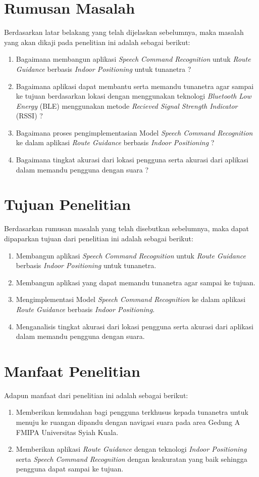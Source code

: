 \newpage


\section{Rumusan Masalah}
Berdasarkan latar belakang yang telah dijelaskan sebelumnya, maka masalah yang akan dikaji pada penelitian ini adalah sebagai berikut:
\begin{enumerate}
	\item Bagaimana membangun aplikasi \textit{Speech Command Recognition} untuk \textit{Route Guidance} berbasis \textit{Indoor Positioning} untuk tunanetra ?
	\item Bagaimana aplikasi dapat membantu serta memandu tunanetra agar sampai ke tujuan berdasarkan lokasi dengan menggunakan teknologi \textit{Bluetooth Low Energy }(BLE) menggunakan metode \textit{Recieved Signal Strength Indicator} (RSSI) ?
	\item Bagaimana proses pengimplementasian Model \textit{Speech Command Recognition} ke dalam aplikasi \textit{Route Guidance} berbasis \textit{Indoor Positioning} ?
	\item Bagaimana tingkat akurasi dari lokasi pengguna serta akurasi dari aplikasi dalam memandu pengguna dengan suara ?
\end{enumerate}

\section{Tujuan Penelitian}
Berdasarkan rumusan masalah yang telah disebutkan sebelumnya, maka dapat dipaparkan tujuan dari penelitian ini adalah sebagai berikut: 
\begin{enumerate}
	\item Membangun aplikasi \textit{Speech Command Recognition} untuk \textit{Route Guidance} berbasis \textit{Indoor Positioning} untuk tunanetra.
	\item Membangun aplikasi yang dapat memandu tunanetra agar sampai ke tujuan.
	\item Mengimplementasi Model \textit{Speech Command Recognition} ke dalam aplikasi \textit{Route Guidance} berbasis \textit{Indoor Positioning}.
	\item Menganalisis tingkat akurasi dari lokasi pengguna serta akurasi dari aplikasi dalam memandu pengguna dengan suara.
\end{enumerate}


\section{Manfaat Penelitian}
Adapun manfaat dari penelitian ini adalah sebagai berikut:
\begin{enumerate}
	\item Memberikan kemudahan bagi pengguna terkhusus kepada tunanetra untuk menuju ke ruangan dipandu dengan navigasi suara pada area Gedung A FMIPA Universitas Syiah Kuala.
	\item Memberikan aplikasi \textit{Route Guidance} dengan teknologi \textit{Indoor Positioning} serta \textit{Speech Command Recognition} dengan keakuratan yang baik sehingga pengguna dapat sampai ke tujuan.
\end{enumerate}


\fancyhf{} 
\fancyfoot[R]{\thepage}
\begin{comment}

\end{comment}